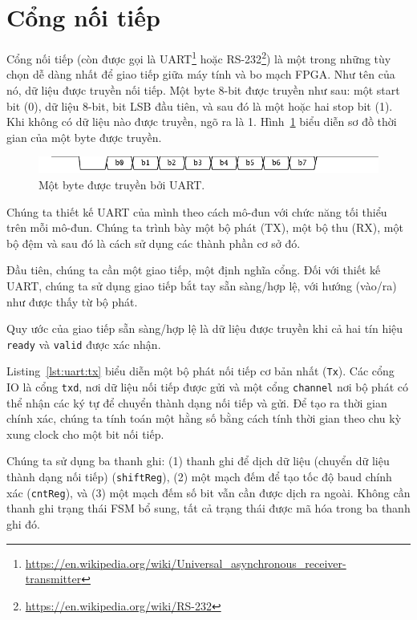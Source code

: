 \documentclass[%
    10pt,
    headinclude, footexclude,
    openright, %
    notitlepage,
    cleardoubleempty,
    headsepline,
    pointlessnumbers,
    bibtotoc, idxtotoc,
    ]{scrbook}
\newcommand{\code}[1]{{\small{\texttt{#1}}}}
\newcommand{\myref}[2]{\href{#1}{#2}}
\renewcommand{\myref}[2]{{#2}{\footnote{\url{#1}}}}
\begin{document}
\section{Cổng nối tiếp}
\label{sec:uart}

Cổng nối tiếp (còn được gọi là \myref{https://en.wikipedia.org/wiki/Universal_asynchronous_receiver-transmitter}{UART} hoặc \myref{https://en.wikipedia.org/wiki/RS-232}{RS-232}) là một trong những tùy chọn dễ dàng nhất để giao tiếp giữa máy tính và bo mạch FPGA. Như tên của nó, dữ liệu được truyền nối tiếp. Một byte 8-bit được truyền như sau: một start bit (0), dữ liệu 8-bit, bit LSB đầu tiên, và sau đó là một hoặc hai stop bit (1). Khi không có dữ liệu nào được truyền, ngõ ra là 1. Hình~\ref{fig:uart:wave} biểu diễn sơ đồ thời gian của một byte được truyền.

\begin{figure}
  \centering
  \includegraphics[scale=1]{figures/uart_wave}
  \caption{Một byte được truyền bởi UART.}
  \label{fig:uart:wave}
\end{figure}

Chúng ta thiết kế UART của mình theo cách mô-đun với chức năng tối thiểu trên mỗi mô-đun. Chúng ta trình bày một bộ phát (TX), một bộ thu (RX), một bộ đệm và sau đó là cách sử dụng các thành phần cơ sở đó.

Đầu tiên, chúng ta cần một giao tiếp, một định nghĩa cổng. Đối với thiết kế UART, chúng ta sử dụng giao tiếp bắt tay sẵn sàng/hợp lệ, với hướng (vào/ra) như được thấy từ bộ phát.


Quy ước của giao tiếp sẵn sàng/hợp lệ là dữ liệu được truyền khi cả hai tín hiệu \code{ready} và \code{valid} được xác nhận. 


Listing~\ref{lst:uart:tx} biểu diễn một bộ phát nối tiếp cơ bản nhất (\code{Tx}). Các cổng IO là cổng \code{txd}, nơi dữ liệu nối tiếp được gửi và một cổng \code{channel} nơi bộ phát có thể nhận các ký tự để chuyển thành dạng nối tiếp và gửi. Để tạo ra thời gian chính xác, chúng ta tính toán một hằng số bằng cách tính thời gian theo chu kỳ xung clock cho một bit nối tiếp.

Chúng ta sử dụng ba thanh ghi:
(1) thanh ghi để dịch dữ liệu (chuyển dữ liệu thành dạng nối tiếp) (\code{shiftReg}),
(2) một mạch đếm để tạo tốc độ baud chính xác (\code{cntReg}), và
(3) một mạch đếm số bit vẫn cần được dịch ra ngoài.
Không cần thanh ghi trạng thái FSM bổ sung, tất cả trạng thái được mã hóa trong ba thanh ghi đó. 
\end{document}
